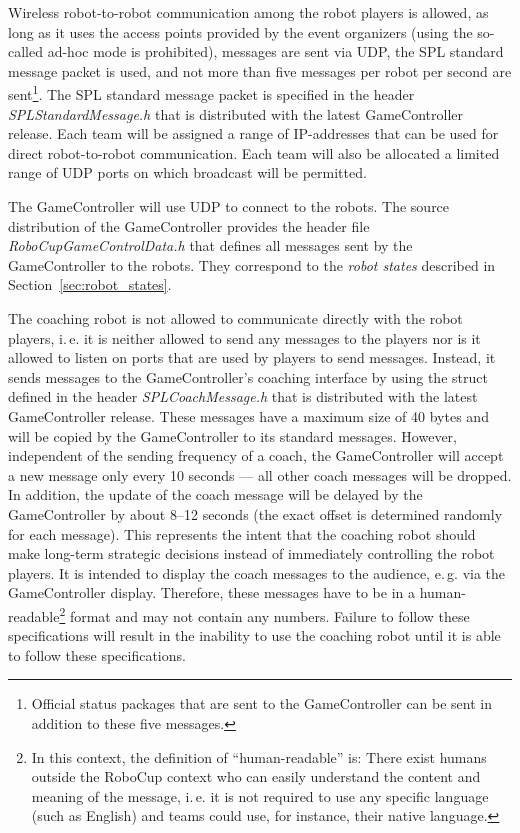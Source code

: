 \documentclass[12pt]{article}
\newcommand{\ie}{\mbox{i.\,e.}\xspace}
\newcommand{\eg}{\mbox{e.\,g.}\xspace}
\begin{document}
Wireless robot-to-robot communication among the robot players is allowed, as long as it uses the access points provided by the event organizers (using the so-called ad-hoc mode is prohibited), messages are sent via UDP, the SPL standard message packet is used, and not more than five messages per robot per second are sent\footnote{Official status packages that are sent to the GameController can be sent in addition to these five messages.}. The SPL standard message packet is specified in the header \emph{SPLStandardMessage.h} that is distributed with the latest GameController release. Each team will be assigned a range of IP-addresses that can be used for direct robot-to-robot communication. Each team will also be allocated a limited range of UDP ports on which broadcast will be permitted.

The GameController will use UDP to connect to the robots. The source distribution of the GameController provides the header file \emph{RoboCupGameControlData.h} that defines all messages sent by the GameController to the robots. They correspond to the \emph{robot states} described in Section~\ref{sec:robot_states}.

The coaching robot is not allowed to communicate directly with the robot players, \ie it is neither allowed to send any messages to the players nor is it allowed to listen on ports that are used by players to send messages. Instead, it sends messages to the GameController's coaching interface by using the struct defined in the header \emph{SPLCoachMessage.h} that is distributed with the latest GameController release. These messages have a maximum size of 40 bytes and will be copied by the GameController to its standard messages. However, independent of the sending frequency of a coach, the GameController will accept a new message only every 10 seconds --- all other coach messages will be dropped. In addition, the update of the coach message will be delayed by the GameController by about 8--12 seconds (the exact offset is determined randomly for each message). This represents the intent that the coaching robot should make long-term strategic decisions instead of immediately controlling the robot players. It is intended to display the coach messages to the audience, \eg via the GameController display. Therefore, these messages have to be in a human-readable\footnote{In this context, the definition of ``human-readable'' is: There exist humans outside the RoboCup context who can easily understand the content and meaning of the message, \ie it is not required to use any specific language (such as English) and teams could use, for instance, their native language.} format and may not contain any numbers.  Failure to follow these specifications will result in the inability to use the coaching robot until it is able to follow these specifications.
\end{document}
